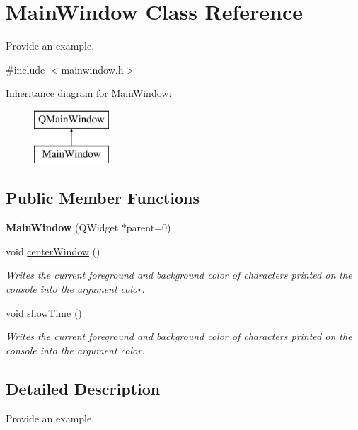 \hypertarget{class_main_window}{\section{Main\+Window Class Reference}
\label{class_main_window}
}


Provide an example.  




{\ttfamily \#include $<$mainwindow.\+h$>$}

Inheritance diagram for Main\+Window\+:\begin{figure}[H]
\begin{center}
\leavevmode
\includegraphics[height=2.000000cm]{class_main_window}
\end{center}
\end{figure}
\subsection*{Public Member Functions}
\begin{DoxyCompactItemize}
\item 
\hypertarget{class_main_window_a8b244be8b7b7db1b08de2a2acb9409db}{{\bfseries Main\+Window} (Q\+Widget $\ast$parent=0)}\label{class_main_window_a8b244be8b7b7db1b08de2a2acb9409db}

\item 
void \hyperlink{class_main_window_a775d79cb8170d36faf4aa9ce4570d8b3}{center\+Window} ()
\begin{DoxyCompactList}\small\item\em Writes the current foreground and background color of characters printed on the console into the argument color. \end{DoxyCompactList}\item 
void \hyperlink{class_main_window_abb90d8cf7c197970c9fe616f6080514f}{show\+Time} ()
\begin{DoxyCompactList}\small\item\em Writes the current foreground and background color of characters printed on the console into the argument color. \end{DoxyCompactList}\end{DoxyCompactItemize}


\subsection{Detailed Description}
Provide an example. 

